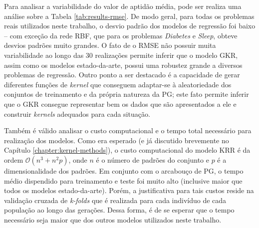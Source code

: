 Para analisar a variabilidade do valor de aptidão média, pode ser realiza uma análise sobre a Tabela \ref{tab:results-rmse}. De modo geral, para todas os problemas reais utilizados neste trabalho, o desvio padrão dos modelos de regressão foi baixo -- com exceção da rede RBF, que para os problemas \textit{Diabetes} e \textit{Sleep}, obteve desvios padrões muito grandes. O fato de o RMSE não possuir muita variabilidade ao longo das 30 realizações permite inferir que o modelo GKR, assim como os modelos estado-da-arte, possui uma robustez grande a diversos problemas de regressão. Outro ponto a ser destacado é a capacidade de gerar diferentes funções de \textit{kernel} que conseguem adaptar-se à aleatoriedade dos conjuntos de treinamento e da própria natureza da PG; este fato permite inferir que o GKR consegue representar bem os dados que são apresentados a ele e construir \textit{kernels} adequados para cada situação.

Também é válido analisar o custo computacional e o tempo total necessário para realização dos modelos. Como era esperado (e já discutido brevemente no Capítulo \ref{chapter:kernel-methods}), o custo computacional do modelo KRR é da ordem $\mathcal{O}(n^3 + n^2p)$, onde $n$ é o número de padrões do conjunto e $p$ é a dimensionalidade dos padrões. Em conjunto com o arcabouço de PG, o tempo médio dispendido para treinamento e teste foi muito alto (inclusive maior que todos os modelos estado-da-arte). Porém, a justificativa para tais custos reside na validação cruzada de \textit{k-folds} que é realizada para cada indivíduo de cada população ao longo das gerações. Dessa forma, é de se esperar que o tempo necessário seja maior que dos outros modelos utilizados neste trabalho.


